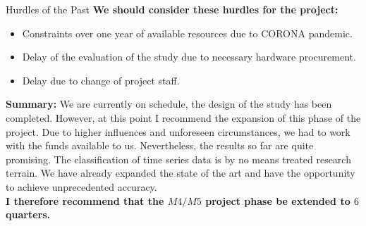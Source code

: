 \documentclass[aspectratio=169,t]{beamer}
\begin{document}
  { 
    \begin{frame}{Hurdles of the Past}
    \textbf{We should consider these hurdles for the project:}\\
    \begin{itemize}
      \item Constraints over one year of available resources due to CORONA pandemic.
      \item Delay of the evaluation of the study due to necessary hardware procurement.
      \item Delay due to change of project staff.
    \end{itemize}

    \textbf{Summary:} We are currently on schedule, the design of the study has been completed. However, at this point I recommend the expansion of this phase of the project. Due to higher influences and unforeseen circumstances, we had to work with the funds available to us. Nevertheless, the results so far are quite promising. The classification of time series data is by no means treated research terrain. We have already expanded the state of the art and have the opportunity to achieve unprecedented accuracy.\\[0.2cm]
    \textbf{I therefore recommend that the $M4/M5$ project phase be extended to $6$ quarters.}
    \end{frame}
  }
\end{document}

